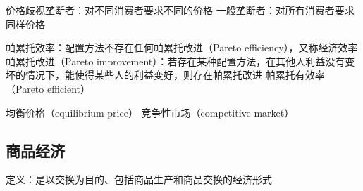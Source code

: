 \documentclass[12pt]{book}
\begin{document}
价格歧视垄断者：对不同消费者要求不同的价格
一般垄断者：对所有消费者要求同样价格

帕累托效率：配置方法不存在任何帕累托改进（Pareto efficiency），又称经济效率
帕累托改进（Pareto improvement）：若存在某种配置方法，在其他人利益没有变坏的情况下，能使得某些人的利益变好，则存在帕累托改进
帕累托有效率（Pareto efficient）

均衡价格（equilibrium price）
竞争性市场（competitive market）





\subsection{商品经济}



定义：是以交换为目的、包括商品生产和商品交换的经济形式
\end{document}
